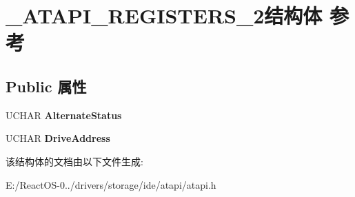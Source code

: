 \hypertarget{struct___a_t_a_p_i___r_e_g_i_s_t_e_r_s__2}{}\section{\+\_\+\+A\+T\+A\+P\+I\+\_\+\+R\+E\+G\+I\+S\+T\+E\+R\+S\+\_\+2结构体 参考}
\label{struct___a_t_a_p_i___r_e_g_i_s_t_e_r_s__2}
\subsection*{Public 属性}
\begin{DoxyCompactItemize}
\item 
\mbox{\label{struct___a_t_a_p_i___r_e_g_i_s_t_e_r_s__2_a071a7d0ebdaddae889b9ce1ed6f9d3a7}} 
U\+C\+H\+AR {\bfseries Alternate\+Status}
\item 
\mbox{\label{struct___a_t_a_p_i___r_e_g_i_s_t_e_r_s__2_a96a3c33eb4367bd25bbc536da45c9768}} 
U\+C\+H\+AR {\bfseries Drive\+Address}
\end{DoxyCompactItemize}


该结构体的文档由以下文件生成\+:\begin{DoxyCompactItemize}
\item 
E\+:/\+React\+O\+S-\/0../drivers/storage/ide/atapi/atapi.\+h\end{DoxyCompactItemize}
